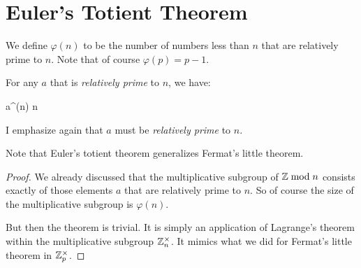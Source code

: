 \section{Euler's Totient Theorem}

\begin{definition}
  We define  $\varphi(n)$ to be the
  number of numbers less than $n$ that are relatively prime to $n$. Note
  that of course $\varphi(p) = p - 1$.
\end{definition}

\begin{theorem}
  For any $a$ that is \emph{relatively prime} to $n$, we have:

  \begin{nedqn}
    a^{\varphi(n)}
   \mod n
  \end{nedqn}
\end{theorem}

\begin{remark}
  I emphasize again that $a$ must be \emph{relatively prime} to $n$.

  Note that Euler's totient theorem generalizes Fermat's little theorem.
\end{remark}

\begin{proof}
  We already discussed that the multiplicative subgroup of $\mathbb{Z} \bmod n$
  consists exactly of those elements $a$ that are relatively prime to
  $n$. So of course the size of the multiplicative subgroup is
  $\varphi(n)$.

  But then the theorem is trivial. It is simply an application of
  Lagrange's theorem within the multiplicative subgroup $\mathbb{Z}_n^\times$. It
  mimics what we did for Fermat's little theorem in $\mathbb{Z}_p^\times$.
\end{proof}
